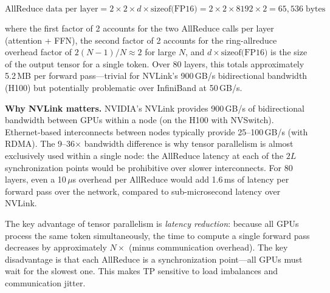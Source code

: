 \begin{equation}
\text{AllReduce data per layer} = 2 \times 2 \times d \times \text{sizeof(FP16)} = 2 \times 2 \times 8192 \times 2 = 65{,}536 \;\text{bytes}
\end{equation}

\noindent where the first factor of 2 accounts for the two AllReduce calls per layer (attention + FFN), the second factor of 2 accounts for the ring-allreduce overhead factor of $2(N-1)/N \approx 2$ for large $N$, and $d \times \text{sizeof(FP16)}$ is the size of the output tensor for a single token. Over 80 layers, this totals approximately 5.2\,MB per forward pass---trivial for NVLink's 900\,GB/s bidirectional bandwidth (H100) but potentially problematic over InfiniBand at 50\,GB/s.

\begin{notebox}
\textbf{Why NVLink matters.} NVIDIA's NVLink provides 900\,GB/s of bidirectional bandwidth between GPUs within a node (on the H100 with NVSwitch). Ethernet-based interconnects between nodes typically provide 25--100\,GB/s (with RDMA). The 9--36$\times$ bandwidth difference is why tensor parallelism is almost exclusively used within a single node: the AllReduce latency at each of the $2L$ synchronization points would be prohibitive over slower interconnects. For 80 layers, even a 10\,$\mu$s overhead per AllReduce would add 1.6\,ms of latency per forward pass over the network, compared to sub-microsecond latency over NVLink.
\end{notebox}

The key advantage of tensor parallelism is \emph{latency reduction}: because all GPUs process the same token simultaneously, the time to compute a single forward pass decreases by approximately $N\times$ (minus communication overhead). The key disadvantage is that each AllReduce is a synchronization point---all GPUs must wait for the slowest one. This makes TP sensitive to load imbalances and communication jitter.

